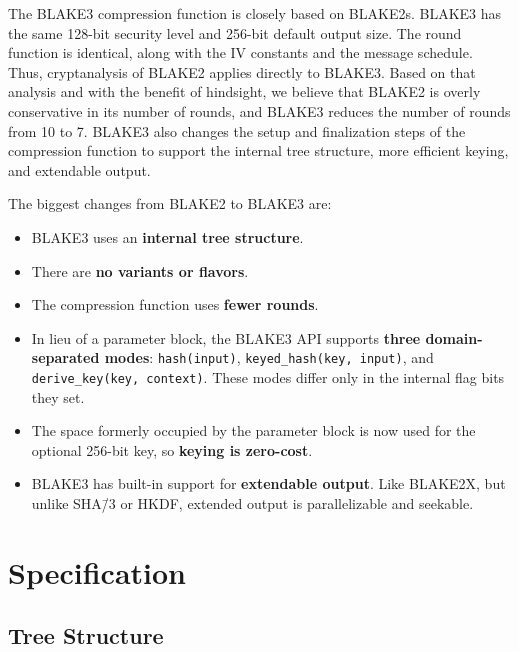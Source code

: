 \documentclass[11pt,notitlepage,a4paper]{article}
\begin{document}
The BLAKE3 compression function is closely based on BLAKE2s. BLAKE3 has the
same 128-bit security level and 256-bit default output size. The round function
is identical, along with the IV constants and the message schedule. Thus,
cryptanalysis of BLAKE2 applies directly to BLAKE3. Based on that analysis and
with the benefit of hindsight, we believe that BLAKE2 is overly conservative in
its number of rounds, and BLAKE3 reduces the number of rounds from 10 to 7.
BLAKE3 also changes the setup and finalization steps of the compression
function to support the internal tree structure, more efficient keying, and
extendable output.

The biggest changes from BLAKE2 to BLAKE3 are:

\begin{itemize}
    \item BLAKE3 uses an \textbf{internal tree structure}.
    \item There are \textbf{no variants or flavors}.
    \item The compression function uses \textbf{fewer rounds}.
    \item In lieu of a parameter block, the BLAKE3 API supports \textbf{three
        domain-separated modes}: \texttt{hash(input)},
        \texttt{keyed\_hash(key, input)}, and \texttt{derive\_key(key,
        context)}. These modes differ only in the internal flag bits they set.
    \item The space formerly occupied by the parameter block is now used for
        the optional 256-bit key, so \textbf{keying is zero-cost}.
    \item BLAKE3 has built-in support for \textbf{extendable output}. Like
        BLAKE2X, but unlike SHA\=/3 or HKDF, extended output is parallelizable
        and seekable.
\end{itemize}

\section{Specification}\label{sec:specification}

\subsection{Tree Structure}\label{sec:tree}
\end{document}
